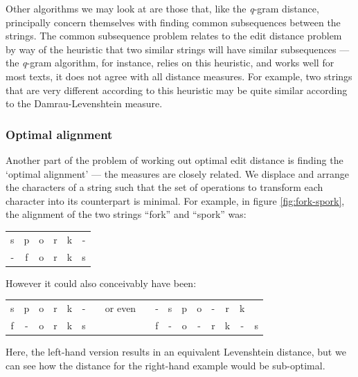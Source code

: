 \documentclass[a4paper,11pt,twoside,notitlepage]{article}
\begin{document}
        Other algorithms we may look at are those that, like the
        \textit{q}-gram distance, principally concern themselves with
        finding common subsequences between the strings. The common
        subsequence problem relates to the edit distance problem by
        way of the heuristic that two similar strings will have
        similar subsequences --- the \textit{q}-gram algorithm, for
        instance, relies on this heuristic, and works well for most
        texts, it does not agree with all distance measures. For
        example, two strings that are very different according to this
        heuristic may be quite similar according to the
        Damrau-Levenshtein measure.
        
        \subsubsection*{Optimal alignment}
        Another part of the problem of working out optimal edit
        distance is finding the `optimal alignment' --- the measures
        are closely related. We displace and arrange the characters of
        a string such that the set of operations to transform each
        character into its counterpart is minimal. For example, in
        figure \ref{fig:fork-spork}, the alignment of the two strings
        ``fork'' and ``spork'' was:

        \begin{center}
          \begin{tabular}{cccccc}
            s & p & o & r & k & -\\
            - & f & o & r & k & s 
          \end{tabular}
        \end{center}

        However it could also conceivably have been:

        \begin{center}
          \begin{tabular}{ccccccccccccccccc}
            s & p & o & r & k & - & & or even & & - & s & p & o & - & r & k &\\
            f & - & o & r & k & s & &         & & f & - & o & - & r & k & - & s    
          \end{tabular}
        \end{center}

        Here, the left-hand version results in an equivalent
        Levenshtein distance, but we can see how the distance for the
        right-hand example would be sub-optimal.
\end{document}
